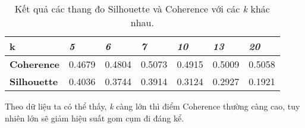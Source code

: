 \begin{table}[]
    \centering
    \begin{tabular}{lllllll}
        \textbf{k}          & \textit{5} & \textit{6} & \textit{7} & \textit{10} & \textit{13} & \textit{20} \\ \hline
        \textbf{Coherence}  & 0.4679     & 0.4804     & 0.5073     & 0.4915      & 0.5009      & 0.5058      \\
        \textbf{Silhouette} & 0.4036     & 0.3744     & 0.3914     & 0.3124      & 0.2927      & 0.1921     
    \end{tabular}
    \caption{Kết quả các thang đo Silhouette và Coherence với các \textit{k}
    khác nhau.}
    \label{table:result}
\end{table}

Theo dữ liệu ta có thể thấy, \textit{k} càng lớn thì điểm Coherence thường càng
cao, tuy nhiên  lớn sẽ giảm hiệu suất gom cụm đi đáng kể.

